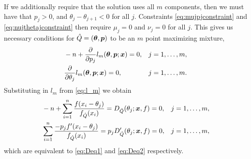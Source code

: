 	If we additionally require that the solution uses all $m$ components, then we must have that $p_j > 0$, and $\theta_j - \theta_{j+1} < 0$ for all $j$. Constraints \eqref{eq:mujpjconstraint} and \eqref{eq:nujthetajconstraint} then require $\mu_j = 0$ and $\nu_j = 0$ for all $j$. This gives us necessary conditions for $\hat{Q} = ({\bm{{\theta}}}, {\bm{{p}}})$ to be an $m$ point maximizing mixture,
	\begin{align}
		&-n + \frac{\partial}{\partial p_j} l_m({\bm{{\theta}}},{\bm{{p}}};{\bm{{x}}}) = 0, && j = 1,\dots,m,\\
		&\frac{\partial}{\partial \theta_j} l_m({\bm{{\theta}}},{\bm{{p}}};{\bm{{x}}}) = 0, && j = 1,\dots, m.
	\end{align}
	Substituting in $l_m$ from \eqref{eq:l_m} we obtain
	\begin{align}
		&-n + \sum_{i=1}^n \frac{f(x_i - \theta_j)}{f_{\hat{Q}}(x_i)} = D_{\hat{Q}}(\theta_j;{\bm{{x}}}, f) =  0, && j = 1, \dots, m, \label{eq:KKT Deq1}\\
		&\sum_{i=1}^n \frac{-p_jf'(x_i - \theta_j)}{f_{\hat{Q}}(x_i)} = p_j D_{\hat{Q}}'(\theta_j;{\bm{{x}}}, f) = 0, && j = 1, \dots, m,
		\label{eq:KKT Deq2}
	\end{align}
	which are equivalent to \eqref{eq:Deq1} and \eqref{eq:Deq2} respectively.


